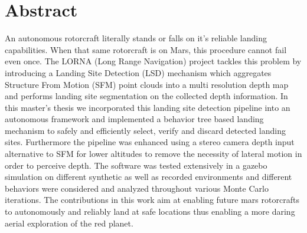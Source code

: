 \chapter*{Abstract}

An autonomous rotorcraft literally stands or falls on it’s reliable landing capabilities. When that same rotorcraft is on Mars, this procedure cannot fail even once. The LORNA (Long Range Navigation) project tackles this problem by introducing a Landing Site Detection (LSD) mechanism which aggregates Structure From Motion (SFM) point clouds into a multi resolution depth map and performs landing site segmentation on the collected depth information. In this master’s thesis we incorporated this landing site detection pipeline into an autonomous framework and implemented a behavior tree based landing mechanism to safely and efficiently select, verify and discard detected landing sites. Furthermore the pipeline was enhanced using a stereo camera depth input alternative to SFM for lower altitudes to remove the necessity of lateral motion in order to perceive depth. The software was tested extensively in a gazebo simulation on different synthetic as well as recorded environments and different behaviors were considered and analyzed throughout various Monte Carlo iterations. The contributions in this work aim at enabling future mars rotorcrafts to autonomously and reliably land at safe locations thus enabling a more daring aerial exploration of the red planet.
